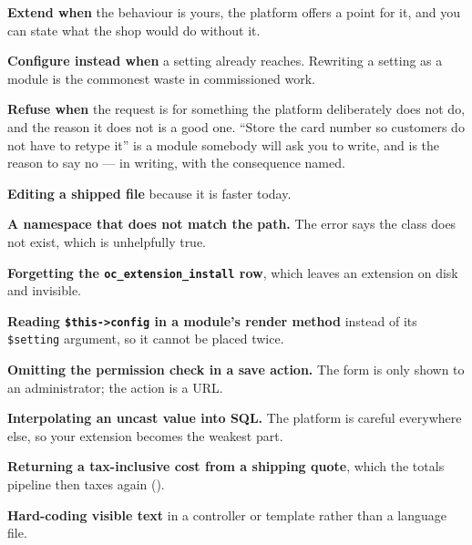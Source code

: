 \begin{conceptbox}
\textbf{Extend when} the behaviour is yours, the platform offers a point for
it, and you can state what the shop would do without it.

\smallskip
\textbf{Configure instead when} a setting already reaches. Rewriting a setting
as a module is the commonest waste in commissioned work.

\smallskip
\textbf{Refuse when} the request is for something the platform deliberately does
not do, and the reason it does not is a good one. ``Store the card number so
customers do not have to retype it'' is a module somebody will ask you to
write, and  is the reason to say no --- in writing, with the
consequence named.
\end{conceptbox}

\begin{pitfall}
\begin{tight}
  \item \textbf{Editing a shipped file} because it is faster today.
  \item \textbf{A namespace that does not match the path.} The error says the
        class does not exist, which is unhelpfully true.
  \item \textbf{Forgetting the \texttt{oc\_extension\_install} row}, which
        leaves an extension on disk and invisible.
  \item \textbf{Reading \texttt{\$this->config} in a module's render method}
        instead of its \texttt{\$setting} argument, so it cannot be placed
        twice.
  \item \textbf{Omitting the permission check in a save action.} The form is
        only shown to an administrator; the action is a URL.
  \item \textbf{Interpolating an uncast value into SQL.} The platform is
        careful everywhere else, so your extension becomes the weakest part.
  \item \textbf{Returning a tax-inclusive cost from a shipping quote}, which
        the totals pipeline then taxes again ().
  \item \textbf{Hard-coding visible text} in a controller or template rather
        than a language file.
\end{tight}
\end{pitfall}

